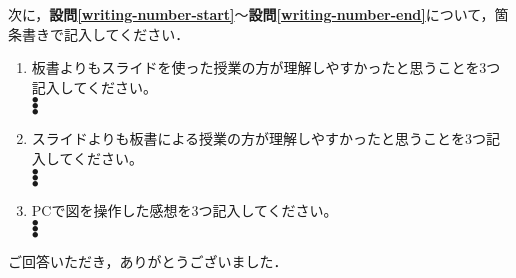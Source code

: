 \documentclass[a4paper]{jarticle}
\begin{document}
\setcounter{choice}{\theenumi}

次に，{\bf 設問\ref{writing-number-start}}〜{\bf 設問\ref{writing-number-end}}について，箇条書きで記入してください．
\begin{enumerate}[\bf 設問1.]
\setcounter{enumi}{\thechoice}
\item%
板書よりもスライドを使った授業の方が理解しやすかったと思うことを3つ記入してください。\\
$\bullet$\\
$\bullet$\\
$\bullet$\\
\label{writing-number-start}

\item%
スライドよりも板書による授業の方が理解しやすかったと思うことを3つ記入してください。\\
$\bullet$\\
$\bullet$\\
$\bullet$\\

\item%
PCで図を操作した感想を3つ記入してください。\\
$\bullet$\\
$\bullet$\\
$\bullet$\\

\label{writing-number-end}
\end{enumerate}

\vfill
\hfill ご回答いただき，ありがとうございました．

\end{document}
